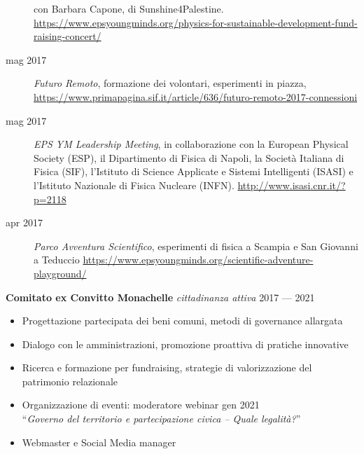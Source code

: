 \documentclass[a4paper]{article}
\begin{document}
\begin{addmargin}[1.5em]{0em}
\begin{description}
          con Barbara Capone, di Sunshine4Palestine.
          \url{https://www.epsyoungminds.org/physics-for-sustainable-development-fund-raising-concert/}
    \item [mag 2017] \emph{Futuro Remoto},
          formazione dei volontari, esperimenti in piazza,
          \url{https://www.primapagina.sif.it/article/636/futuro-remoto-2017-connessioni}
    \item[mag 2017] \emph{EPS YM Leadership Meeting},
          in collaborazione con la European Physical Society (ESP),
          il Dipartimento di Fisica di Napoli,
          la Società Italiana di Fisica (SIF),
          l’Istituto di Science Applicate e Sistemi Intelligenti (ISASI)
          e l’Istituto Nazionale di Fisica Nucleare (INFN).
          \url{http://www.isasi.cnr.it/?p=2118}
    \item [apr 2017] \emph{Parco Avventura Scientifico},
          esperimenti di fisica a Scampia e San Giovanni a Teduccio
          \url{https://www.epsyoungminds.org/scientific-adventure-playground/}
  \end{description}
\end{addmargin}

\vspace*{2mm}
\textbf{Comitato ex Convitto Monachelle}
{\sl cittadinanza attiva} \hfill 2017 --- 2021\\
\begin{itemize} \itemsep 1pt
  \item Progettazione partecipata dei beni comuni, metodi di governance
        allargata
  \item Dialogo con le amministrazioni, promozione proattiva di pratiche
        innovative
  \item Ricerca e formazione per fundraising, strategie di valorizzazione del
        patrimonio relazionale
  \item Organizzazione di eventi:
  moderatore webinar gen 2021 \\
        ``\textit{Governo del territorio e partecipazione civica – Quale
        legalità?}''
  \item Webmaster e Social Media manager
\end{itemize}
\end{document}

